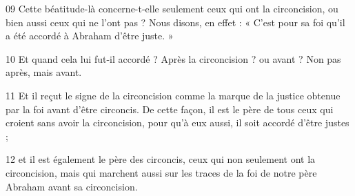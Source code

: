 
09 Cette béatitude-là concerne-t-elle seulement ceux qui ont la circoncision, ou bien aussi ceux qui ne l’ont pas ? Nous disons, en effet : « C’est pour sa foi qu’il a été accordé à Abraham d’être juste. »

10 Et quand cela lui fut-il accordé ? Après la circoncision ? ou avant ? Non pas après, mais avant.

11 Et il reçut le signe de la circoncision comme la marque de la justice obtenue par la foi avant d’être circoncis. De cette façon, il est le père de tous ceux qui croient sans avoir la circoncision, pour qu’à eux aussi, il soit accordé d’être justes ;

12 et il est également le père des circoncis, ceux qui non seulement ont la circoncision, mais qui marchent aussi sur les traces de la foi de notre père Abraham avant sa circoncision.
